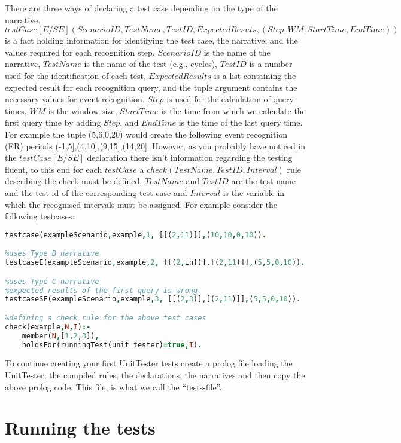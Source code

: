 \documentclass[a4paper,10pt]{article}
\begin{document}
 There are three ways of declaring a test case depending on the type of the narrative.\linebreak
 $\mathit{testCase[E/SE](ScenarioID,TestName,TestID,ExpectedResuts,(Step,WM,StartTime,EndTime))}$ is a fact holding information for identifying the test case,
 the narrative, and the values required for each recognition step. $ScenarioID$ is the name of the narrative, $TestName$ is the name of the test (e.g., cycles), $TestID$ is a 
 number used for the identification of each test, $ExpectedResults$ is a list containing the expected result for each recognition query, and the tuple argument contains the necessary values for event recognition. $Step$ is used for the calculation of query times, $WM$ is the window size, $StartTime$ is the time from which we calculate the first query time by adding $Step$, and $EndTime$ is the time of the last query time. For example the tuple (5,6,0,20) would create the following event recognition (ER) periods {(-1,5],(4,10],(9,15],(14,20]}. However, as you probably have noticed in the $testCase[E/SE]$ declaration there isn't information regarding the testing fluent, to this end for each $testCase$ a \linebreak$check(TestName,TestID,Interval)$ rule describing the check must be defined, $TestName$ and $TestID$ are the test name and the test id of the corresponding test case and $Interval$ is the variable in which the recognised intervals must be assigned. For example consider the following testcases:
 \begin{lstlisting}[language=Prolog]
%uses Type A narrative
testcase(exampleScenario,example,1, [[(2,11)]],(10,10,0,10)).

%uses Type B narrative
testcaseE(exampleScenario,example,2, [[(2,inf)],[(2,11)]],(5,5,0,10)).

%uses Type C narrative
%expected results of the first query is wrong
testcaseSE(exampleScenario,example,3, [[(2,3)],[(2,11)]],(5,5,0,10)). 

%defining a check rule for the above test cases
check(example,N,I):-
    member(N,[1,2,3]),
    holdsFor(runningTest(unit_tester)=true,I).
\end{lstlisting}
To continue creating your first UnitTester tests create a prolog file loading the UnitTester, the compiled rules, the declarations, the narratives and then copy the above prolog code. This file, is what we call the ``tests-file''.

\section{Running the tests}
\end{document}
